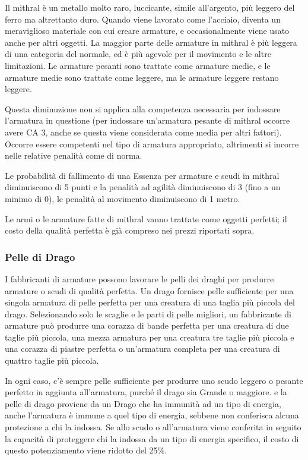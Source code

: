 \documentclass[a4paper,11pt,twoside,openany]{book}
\begin{document}
\bigskip

Il mithral è un metallo molto raro, luccicante, simile all'argento, più leggero del ferro ma altrettanto duro. Quando viene lavorato come l'acciaio, diventa un meraviglioso materiale con cui creare armature, e occasionalmente viene usato anche per altri oggetti. La maggior parte delle armature in mithral è più leggera di una categoria del normale, ed è più agevole per il movimento e le altre limitazioni. Le armature pesanti sono trattate come armature medie, e le armature medie sono trattate come leggere, ma le armature leggere restano leggere.

Questa diminuzione non si applica alla competenza necessaria per indossare l'armatura in questione (per indossare un'armatura pesante di mithral occorre avere CA 3, anche se questa viene considerata come media per altri fattori). Occorre essere competenti nel tipo di armatura appropriato, altrimenti si incorre nelle relative penalità come di norma.

Le probabilità di fallimento di una Essenza per armature e scudi in mithral diminuiscono di 5 punti e la penalità ad agilità diminuiscono di 3 (fino a un minimo di 0), le penalità al movimento diminuiscono di 1 metro.

Le armi o le armature fatte di mithral vanno trattate come oggetti perfetti; il costo della qualità perfetta è già compreso nei prezzi riportati sopra.

\subsubsection{Pelle di Drago}

\label{pelle-di-drago}

I fabbricanti di armature possono lavorare le pelli dei draghi per produrre armature o scudi di qualità perfetta.
Un drago fornisce pelle sufficiente per una singola armatura di pelle perfetta per una creatura di una taglia più piccola del drago. Selezionando solo le scaglie e le parti di pelle migliori, un fabbricante di armature può produrre una corazza di bande perfetta per una creatura di due taglie più piccola, una mezza armatura per una creatura tre taglie più piccola e una corazza di piastre perfetta o un'armatura completa per una creatura di quattro taglie più piccola.

In ogni caso, c'è sempre pelle sufficiente per produrre uno scudo leggero o pesante perfetto in aggiunta all'armatura, purché il drago sia Grande o maggiore.
e la pelle di drago proviene da un Drago che ha immunità ad un tipo di energia, anche l'armatura è immune a quel tipo di energia, sebbene non conferisca alcuna protezione a chi la indossa. Se allo scudo o all'armatura viene conferita in seguito la capacità di proteggere chi la indossa da un tipo di energia specifico, il costo di questo potenziamento viene ridotto del 25\%.
\end{document}
